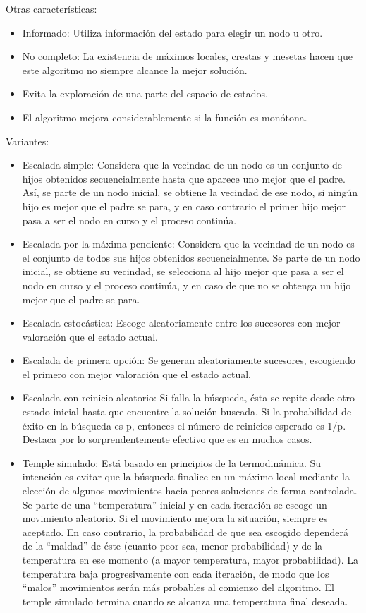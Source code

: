 \documentclass[12pt]{article}
\begin{document}
Otras características:
\begin{itemize}
\item Informado: Utiliza información del estado para elegir un nodo u otro.
\item No completo: La existencia de máximos locales, crestas y mesetas hacen 
  que este algoritmo no siempre alcance la mejor solución.
\item Evita la exploración de una parte del espacio de estados.
\item El algoritmo mejora considerablemente si la función es monótona.
\end{itemize}

Variantes:
\begin{itemize}
\item Escalada simple: Considera que la vecindad de un nodo es un conjunto de 
  hijos obtenidos secuencialmente hasta que aparece uno mejor que el padre. Así, 
  se parte de un nodo inicial, se obtiene la vecindad de ese nodo, si ningún hijo 
  es mejor que el padre se para, y en caso contrario el primer hijo mejor pasa a 
  ser el nodo en curso y el proceso continúa.
\item Escalada por la máxima pendiente: Considera que la vecindad de un nodo es 
  el conjunto de todos sus hijos obtenidos secuencialmente. Se parte de un nodo 
  inicial, se obtiene su vecindad, se selecciona al hijo mejor que pasa a ser el 
  nodo en curso y el proceso continúa, y en caso de que no se obtenga un hijo 
  mejor que el padre se para.
\item Escalada estocástica: Escoge aleatoriamente entre los sucesores con 
  mejor valoración que el estado actual.
\item Escalada de primera opción: Se generan aleatoriamente sucesores, 
  escogiendo el primero con mejor valoración que el estado actual.
\item Escalada con reinicio aleatorio: Si falla la búsqueda, ésta se repite 
  desde otro estado inicial hasta que encuentre la solución buscada. Si la 
  probabilidad de éxito en la búsqueda es p, entonces el número de reinicios 
  esperado es 1/p. Destaca por lo sorprendentemente efectivo que es en muchos casos.
\item Temple simulado: 
  Está basado en principios de la termodinámica. Su intención es evitar 
  que la búsqueda finalice en un máximo local mediante la elección de algunos 
  movimientos hacia peores soluciones de forma controlada. Se parte de una 
  “temperatura” inicial y en cada iteración se escoge un 
  movimiento aleatorio. Si el movimiento mejora la situación, siempre es 
  aceptado. En caso contrario, la probabilidad de que sea escogido dependerá 
  de la “maldad” de éste (cuanto peor sea, menor probabilidad) y de la 
  temperatura en ese momento (a mayor temperatura, mayor probabilidad). La 
  temperatura baja progresivamente con cada iteración, de modo que los “malos” 
  movimientos serán más probables al comienzo del algoritmo. El temple simulado 
  termina cuando se alcanza una temperatura final deseada.
\end{itemize}
\end{document}
